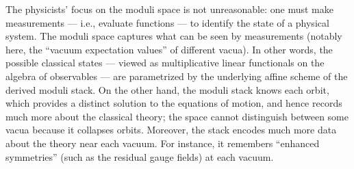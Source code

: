 \documentclass[11pt]{amsart}
\begin{document}
\begin{rmk}\label{sols vs states}
The physicists' focus on the moduli space is not unreasonable:
one must make measurements --- i.e., evaluate functions --- to identify the state of a physical system.
The moduli space captures what can be seen by measurements (notably here, the ``vacuum expectation values'' of different vacua).
In other words, the possible classical states --- viewed as multiplicative linear functionals on the algebra of observables --- are parametrized by the underlying affine scheme of the derived moduli stack.
On the other hand, the moduli stack knows each orbit, which provides a distinct solution to the equations of motion,
and hence records much more about the classical theory; 
the space cannot distinguish between some vacua because it collapses orbits.
Moreover, the stack encodes much more data about the theory near each vacuum.
For instance, it remembers ``enhanced symmetries'' (such as the residual gauge fields) at each vacuum.
\end{rmk}
\end{document}

